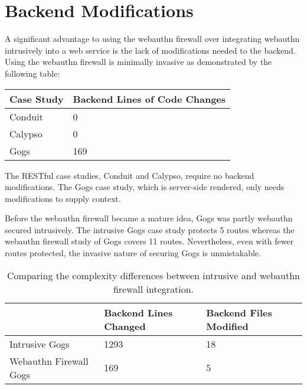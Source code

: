 \fi

\section{Backend Modifications}\label{Sec:BackendModifications}

A significant advantage to using the webauthn firewall over integrating webauthn intrusively into a web service is the lack of modifications needed to the backend. Using the webauthn firewall is minimally invasive as demonstrated by the following table:

\begin{table}[h]
\centering

\begin{tabular}{ m{4.5cm} m{6cm}  } 
 \hline
 Case Study & Backend Lines of Code Changes \\ 
 \hline \hline

 Conduit & 0 \\ \hline

 Calypso & 0 \\ \hline

 Gogs & 169 \\ \hline

\end{tabular}
\end{table}

The RESTful case studies, Conduit and Calypso, require no backend modifications. The Gogs case study, which is server-side rendered, only needs modifications to supply context. 

Before the webauthn firewall became a mature idea, Gogs was partly webauthn secured intrusively. The intrusive Gogs case study protects 5 routes whereas the webauthn firewall study of Gogs covers 11 routes. Nevertheless, even with fewer routes protected, the invasive nature of securing Gogs is unmistakable.

\begin{table}[h]
\centering

\begin{tabular}{ m{5cm} m{4.5cm} m{4.5cm}  } 
 \hline
 & Backend Lines Changed & Backend Files Modified \\ 
 \hline \hline

 Intrusive Gogs & 1293 & 18 \\ \hline

 Webauthn Firewall Gogs & 169 & 5 \\ \hline


\end{tabular}
\caption{Comparing the complexity differences between intrusive and webauthn firewall integration.}
\end{table}


